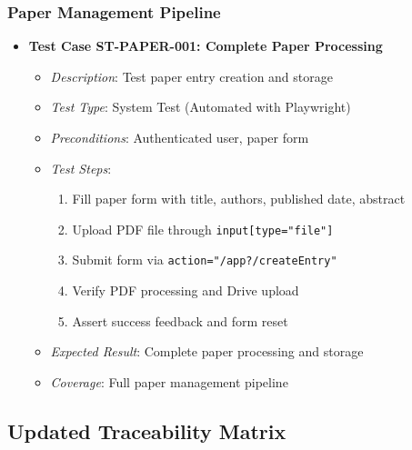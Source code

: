 \documentclass[12pt]{article}
\begin{document}
\subsubsection{Paper Management Pipeline}
\begin{itemize}
  \item \textbf{Test Case ST-PAPER-001: Complete Paper Processing}
    \begin{itemize}
      \item \textit{Description}: Test paper entry creation and storage
      \item \textit{Test Type}: System Test (Automated with Playwright)
      \item \textit{Preconditions}: Authenticated user, paper form
      \item \textit{Test Steps}:
        \begin{enumerate}
          \item Fill paper form with title, authors, published date, abstract
          \item Upload PDF file through \texttt{input[type="file"]}
          \item Submit form via \texttt{action="/app?/createEntry"}
          \item Verify PDF processing and Drive upload
          \item Assert success feedback and form reset
        \end{enumerate}
      \item \textit{Expected Result}: Complete paper processing and storage
      \item \textit{Coverage}: Full paper management pipeline
    \end{itemize}
\end{itemize}

\subsection{Updated Traceability Matrix}
\end{document}
